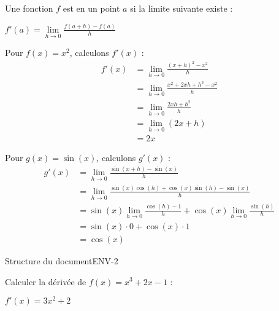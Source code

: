 \begin{Definition}
    Une fonction $f$ est  en un point $a$ si la limite suivante existe :
    \begin{center}
    $f'(a) = \lim\limits_{h \to 0} \frac{f(a+h) - f(a)}{h}$
    \end{center}
    \end{Definition}
    
    \begin{Exemple}
    \begin{multicols}{2}
    Pour $f(x) = x^2$, calculons $f'(x)$ :
    \begin{align*}
    f'(x) &= \lim\limits_{h \to 0} \frac{(x+h)^2 - x^2}{h}\\
    &= \lim\limits_{h \to 0} \frac{x^2 + 2xh + h^2 - x^2}{h}\\
    &= \lim\limits_{h \to 0} \frac{2xh + h^2}{h}\\
    &= \lim\limits_{h \to 0} (2x + h)\\
    &= 2x
    \end{align*}
    
    \columnbreak
    
    Pour $g(x) = \sin(x)$, calculons $g'(x)$ :
    \begin{align*}
    g'(x) &= \lim\limits_{h \to 0} \frac{\sin(x+h) - \sin(x)}{h}\\
    &= \lim\limits_{h \to 0} \frac{\sin(x)\cos(h) + \cos(x)\sin(h) - \sin(x)}{h}\\
    &= \sin(x)\lim\limits_{h \to 0}\frac{\cos(h)-1}{h} + \cos(x)\lim\limits_{h \to 0}\frac{\sin(h)}{h}\\
    &= \sin(x) \cdot 0 + \cos(x) \cdot 1\\
    &= \cos(x)
    \end{align*}
    \end{multicols}
    \end{Exemple}
 \begin{EXO}{Structure du document}{ENV-2}
   
    Calculer la dérivée de $f(x) = x^3 + 2x - 1$ :
    \begin{crep}[extra lines=3]
    $f'(x) = 3x^2 + 2$
    \end{crep}
\end{EXO}
